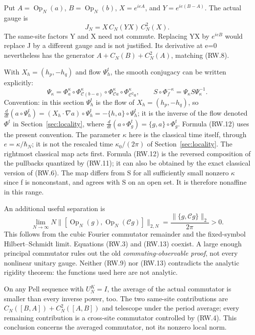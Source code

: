 Put \(A=\operatorname{Op}_N(a)\), \(B=\operatorname{Op}_N(b)\), \(X=e^{ieA}\), and \(Y=e^{ie(B-A)}\). The actual gauge is \[
                \boxed{J_N=X\,C_N(YX)\,C_N^2(X).}          \tag{RW.11}
\] The same-site factors Y and X need not commute. Replacing YX by \(e^{ieB}\) would replace J by a different gauge and is not justified. Its derivative at e=0 nevertheless has the generator \(A+C_N(B)+C_N^2(A)\), matching (RW.8).

With \(X_h=(h_p,-h_q)\) and flow \(\Psi_h^t\), the smooth conjugacy can be written explicitly: \[
 \Psi_\kappa=\Phi_a^\kappa\circ\Phi_{\mathcal C(b-a)}^\kappa
       \circ\Phi_{\mathcal Ca}^\kappa\circ\Phi_{\mathcal C^2a}^\kappa,
 \qquad S\circ\Phi_f^{-\kappa}=\Psi_\kappa S\Psi_\kappa^{-1}. \tag{RW.12}
\] Convention: in this section \(\Psi_h^t\) is the flow of \(X_h=(h_p,-h_q)\), so \(\frac{d}{dt}(a\circ\Psi_h^t)=(X_h\cdot\nabla a)\circ\Psi_h^t=-\{h,a\}\circ\Psi_h^t\); it is the inverse of the flow denoted \(\Phi^t\) in Section~\ref{sec:locality}, where \(\frac{d}{dt}(a\circ\Phi_g^t)=\{g,a\}\circ\Phi_g^t\). Formula (RW.12) uses the present convention. The parameter \(\kappa\) here is the classical time itself, through \(e=\kappa/\hbar_N\); it is not the rescaled time \(\kappa_0/(2\pi)\) of Section~\ref{sec:locality}. The rightmost classical map acts first. Formula (RW.12) is the reversed composition of the pullbacks quantized by (RW.11); it can also be obtained by the exact classical version of (RW.6). The map differs from S for all sufficiently small nonzero \(\kappa\) since f is nonconstant, and agrees with S on an open set. It is therefore nonaffine in this range.

An additional useful separation is \[
 \lim_{N\to\infty}N\|[\operatorname{Op}_N(g),
                    \operatorname{Op}_N(\mathcal Cg)]\|_{2,N}
       =\frac{\|\{g,\mathcal Cg\}\|_2}{2\pi}>0.             \tag{RW.13}
\] This follows from the cubic Fourier commutator remainder and the fixed-symbol Hilbert--Schmidt limit. Equations (RW.3) and (RW.13) coexist. A large enough principal commutator rules out the old \emph{commuting-observable proof}, not every nonlinear unitary gauge. Neither (RW.9) nor (RW.13) contradicts the analytic rigidity theorem: the functions used here are not analytic.

On any Pell sequence with \(U_N^K=I\), the average of the actual commutator is smaller than every inverse power, too. The two same-site contributions are \(C_N([B,A])+C_N^2([A,B])\) and telescope under the period average; every remaining contribution is a cross-site commutator controlled by (RW.4). This conclusion concerns the averaged commutator, not its nonzero local norm.

